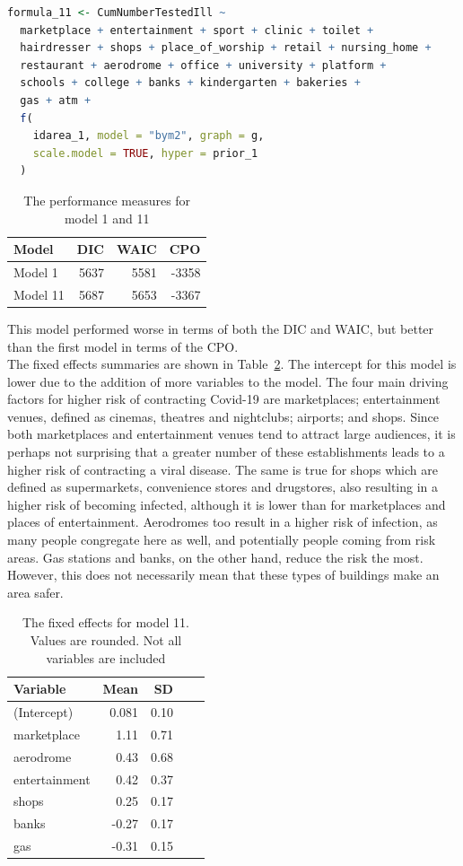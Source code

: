 \begin{lstlisting}[language=R]
formula_11 <- CumNumberTestedIll ~
  marketplace + entertainment + sport + clinic + toilet +
  hairdresser + shops + place_of_worship + retail + nursing_home +
  restaurant + aerodrome + office + university + platform +
  schools + college + banks + kindergarten + bakeries +
  gas + atm +
  f(
    idarea_1, model = "bym2", graph = g,
    scale.model = TRUE, hyper = prior_1
  )
\end{lstlisting}
\begin{table}[H] 
\caption{The performance measures for model 1 and 11\label{model11}}
\begin{tabular}{l r r r}
\toprule
\textbf{Model}	& \textbf{DIC}	& \textbf{WAIC} & \textbf{CPO} \\
\midrule
Model 1 & 5637 & 5581 & -3358 \\
Model 11 & 5687 & 5653 & -3367 \\
\bottomrule
\end{tabular}
\end{table}
This model performed worse in terms of both the DIC and WAIC, but better than the first model in terms of the CPO. \\
The fixed effects summaries are shown in Table~\ref{fixed11}. The intercept for this model is lower due to the addition of more variables to the model. The four main driving factors for higher risk of contracting Covid-19 are marketplaces; entertainment venues, defined as cinemas, theatres and nightclubs; airports; and shops. Since both marketplaces and entertainment venues tend to attract large audiences, it is perhaps not surprising that a greater number of these establishments leads to a higher risk of contracting a viral disease. The same is true for shops which are defined as supermarkets, convenience stores and drugstores, also resulting in a higher risk of becoming infected, although it is lower than for marketplaces and places of entertainment. Aerodromes too result in a higher risk of infection, as many people congregate here as well, and potentially people coming from risk areas. Gas stations and banks, on the other hand, reduce the risk the most. However, this does not necessarily mean that these types of buildings make an area safer.
\begin{table}[H] 
\caption{The fixed effects for model 11. Values are rounded. Not all variables are included\label{fixed11}}
\begin{tabular}{l r r r r}
\toprule
\textbf{Variable}	& \textbf{Mean}	& \textbf{SD} \\
\midrule
(Intercept) & 0.081 & 0.10 \\
marketplace & 1.11 & 0.71 \\
aerodrome & 0.43 & 0.68 \\
entertainment & 0.42 & 0.37 \\
shops & 0.25 & 0.17 \\
banks & -0.27 & 0.17 \\
gas & -0.31 & 0.15 \\
\bottomrule
\end{tabular}
\end{table}
